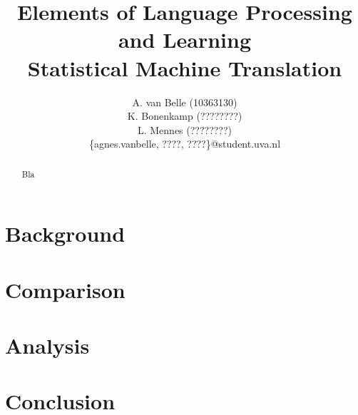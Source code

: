 \documentclass[11pt,twocolumn]{article}
\title{{\small Elements of Language Processing and Learning}\\ Statistical Machine Translation}
\author{A. van Belle (10363130) \\ K. Bonenkamp (????????) \\  L. Mennes (????????) \\ \{agnes.vanbelle, ????, ????\}@student.uva.nl}
\begin{document}
	\maketitle

 \begin{abstract}
 Bla
 \end{abstract}
 
\section{Background}

\section{Comparison}

\section{Analysis}

\section{Conclusion}




\nocite{*}
\end{document}
